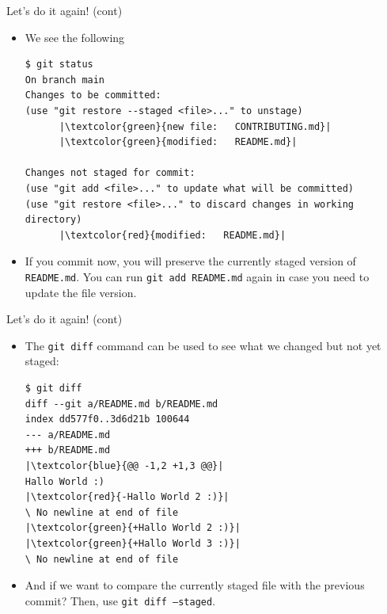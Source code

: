 \documentclass[
hyperref={bookmarks=false},
xcolor={dvipsnames,svgnames*,x11names*}, 
12pt
]{beamer}
\begin{document}
\begin{frame}[fragile]{Let's do it again! (cont)}
\vspace{-0.5cm}
\begin{itemize}
\itemsep 2ex
\item We see the following
\begin{lstlisting}
$ git status
On branch main
Changes to be committed:
(use "git restore --staged <file>..." to unstage)
      |\textcolor{green}{new file:   CONTRIBUTING.md}|
      |\textcolor{green}{modified:   README.md}|

Changes not staged for commit:
(use "git add <file>..." to update what will be committed)
(use "git restore <file>..." to discard changes in working directory)
      |\textcolor{red}{modified:   README.md}|
\end{lstlisting}
\item If you commit now, you will preserve the currently staged version of \texttt{README.md}. You can run \texttt{git add README.md} again in case you need to update the file version. 
\end{itemize}
\end{frame}

\begin{frame}[fragile]{Let's do it again! (cont)}
\vspace{-0.5cm}
\begin{itemize}
\itemsep 2ex
\item The \texttt{git diff} command can be used to see what we changed but not yet staged: 
\begin{lstlisting}
$ git diff
diff --git a/README.md b/README.md
index dd577f0..3d6d21b 100644
--- a/README.md
+++ b/README.md
|\textcolor{blue}{@@ -1,2 +1,3 @@}|
Hallo World :)
|\textcolor{red}{-Hallo World 2 :)}|
\ No newline at end of file
|\textcolor{green}{+Hallo World 2 :)}|
|\textcolor{green}{+Hallo World 3 :)}|
\ No newline at end of file
\end{lstlisting}
\item And if we want to compare the currently staged file with the previous commit? Then, use \texttt{git diff --staged}. 
\end{itemize}
\end{frame}
\end{document}

